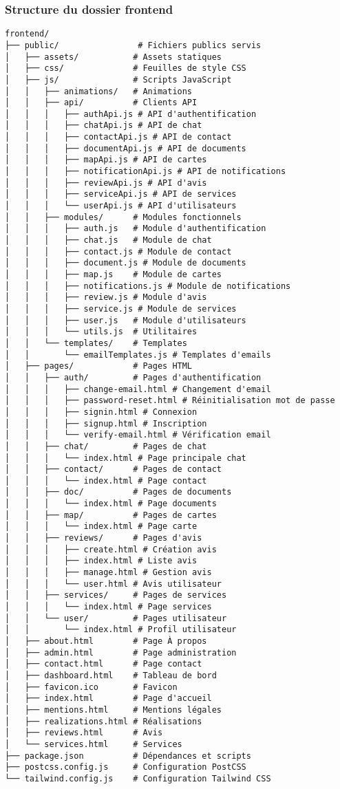 \documentclass[12pt, a4paper]{article}
\begin{document}
\subsubsection{Structure du dossier frontend}
\begin{lstlisting}
frontend/
├── public/                # Fichiers publics servis
│   ├── assets/           # Assets statiques
│   ├── css/              # Feuilles de style CSS
│   ├── js/               # Scripts JavaScript
│   │   ├── animations/   # Animations
│   │   ├── api/          # Clients API
│   │   │   ├── authApi.js # API d'authentification
│   │   │   ├── chatApi.js # API de chat
│   │   │   ├── contactApi.js # API de contact
│   │   │   ├── documentApi.js # API de documents
│   │   │   ├── mapApi.js # API de cartes
│   │   │   ├── notificationApi.js # API de notifications
│   │   │   ├── reviewApi.js # API d'avis
│   │   │   ├── serviceApi.js # API de services
│   │   │   └── userApi.js # API d'utilisateurs
│   │   ├── modules/      # Modules fonctionnels
│   │   │   ├── auth.js   # Module d'authentification
│   │   │   ├── chat.js   # Module de chat
│   │   │   ├── contact.js # Module de contact
│   │   │   ├── document.js # Module de documents
│   │   │   ├── map.js    # Module de cartes
│   │   │   ├── notifications.js # Module de notifications
│   │   │   ├── review.js # Module d'avis
│   │   │   ├── service.js # Module de services
│   │   │   ├── user.js   # Module d'utilisateurs
│   │   │   └── utils.js  # Utilitaires
│   │   └── templates/    # Templates
│   │       └── emailTemplates.js # Templates d'emails
│   ├── pages/            # Pages HTML
│   │   ├── auth/         # Pages d'authentification
│   │   │   ├── change-email.html # Changement d'email
│   │   │   ├── password-reset.html # Réinitialisation mot de passe
│   │   │   ├── signin.html # Connexion
│   │   │   ├── signup.html # Inscription
│   │   │   └── verify-email.html # Vérification email
│   │   ├── chat/         # Pages de chat
│   │   │   └── index.html # Page principale chat
│   │   ├── contact/      # Pages de contact
│   │   │   └── index.html # Page contact
│   │   ├── doc/          # Pages de documents
│   │   │   └── index.html # Page documents
│   │   ├── map/          # Pages de cartes
│   │   │   └── index.html # Page carte
│   │   ├── reviews/      # Pages d'avis
│   │   │   ├── create.html # Création avis
│   │   │   ├── index.html # Liste avis
│   │   │   ├── manage.html # Gestion avis
│   │   │   └── user.html # Avis utilisateur
│   │   ├── services/     # Pages de services
│   │   │   └── index.html # Page services
│   │   └── user/         # Pages utilisateur
│   │       └── index.html # Profil utilisateur
│   ├── about.html        # Page À propos
│   ├── admin.html        # Page administration
│   ├── contact.html      # Page contact
│   ├── dashboard.html    # Tableau de bord
│   ├── favicon.ico       # Favicon
│   ├── index.html        # Page d'accueil
│   ├── mentions.html     # Mentions légales
│   ├── realizations.html # Réalisations
│   ├── reviews.html      # Avis
│   └── services.html     # Services
├── package.json          # Dépendances et scripts
├── postcss.config.js     # Configuration PostCSS
└── tailwind.config.js    # Configuration Tailwind CSS
\end{lstlisting}
\end{document}
